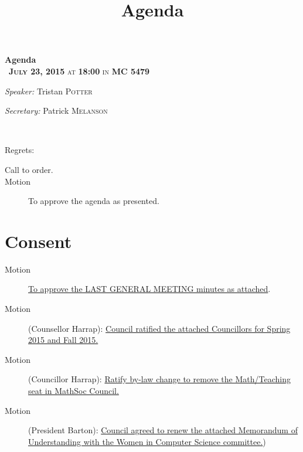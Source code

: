 \documentclass[12pt, letterpaper]{article}
\title{Agenda}
\newcommand{\meetingDate}{July 23, 2015}
\newcommand{\meetingTime}{18:00}
\newcommand{\meetingLocation}{MC 5479}
\begin{document}
\hypersetup{} %


\begin{center}
{ \huge \bfseries Agenda \\[0.4cm] }
{\textsc{~\textbf{\meetingDate} at \textbf{\meetingTime} in \textbf{\meetingLocation}}}
\\[0.2cm]

\begin{minipage}[t]{0.5\textwidth}
\begin{flushleft} \large
\emph{Speaker:}
Tristan \textsc{Potter}
\end{flushleft}
\end{minipage}%
\begin{minipage}[t]{0.5\textwidth}
\begin{flushright} \large
\emph{Secretary:} 
Patrick \textsc{Melanson}
\end{flushright}
\end{minipage}

\HRule \\[0.4cm]
\end{center}
Regrets: 
\begin{description}
	\item[Call to order.]
	\item[Motion] To approve the agenda as presented.
\end{description}
\section*{Consent}
\begin{description}
	\item[Motion] \hyperref[minutes]{To approve the LAST GENERAL MEETING minutes as attached}.
	\item[Motion] (Counsellor Harrap): \hyperref[noms]{Council ratified the attached Councillors for Spring 2015 and Fall 2015.}
	\item[Motion] (Councillor Harrap): \hyperref[teaching]{Ratify by-law change to remove the Math/Teaching seat in MathSoc Council.}
	\item[Motion] (President Barton): \hyperref[wics]{Council agreed to renew the attached Memorandum of Understanding with the Women in Computer Science committee.})
\end{description}
\HRule
\end{document}
